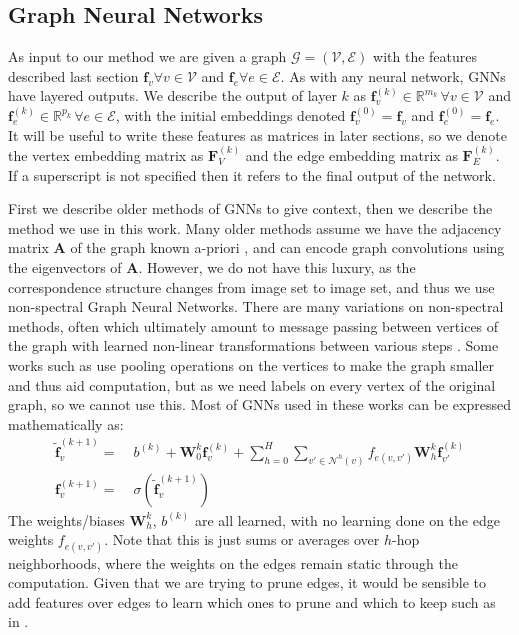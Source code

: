 \documentclass[10pt,twocolumn,letterpaper]{article}
\newcommand{\bR}{\mathbb{R}}
\newcommand{\mat}[1]{\mathbf{#1}}
\begin{document}
\subsection{Graph Neural Networks}
As input to our method we are given a graph $\mathcal{G} = (\mathcal{V}, \mathcal{E})$ with the features described last section $\mat{f}_v \forall v \in \mathcal{V}$ and $\mat{f}_e \forall e \in \mathcal{E}$.
As with any neural network, GNNs have layered outputs.
We describe the output of layer $k$ as $\mat{f}_v^{(k)} \in \bR^{m_k}\, \forall v \in \mathcal{V}$ and $\mat{f}_e^{(k)} \in \bR^{p_k}\, \forall e \in \mathcal{E}$, with the initial embeddings denoted $\mat{f}_v^{(0)} = \mat{f}_v$ and $\mat{f}_e^{(0)} = \mat{f}_e$.
It will be useful to write these features as matrices in later sections, so we denote the vertex embedding matrix as $\mat{F}_V^{(k)}$ and the edge embedding matrix as $\mat{F}_E^{(k)}$.
If a superscript is not specified then it refers to the final output of the network.

First we describe older methods of GNNs to give context, then we describe the method we use in this work.
Many older methods assume we have the adjacency matrix $\mat{A}$ of the graph known a-priori \cite{bruna2013spectral}, and can encode graph convolutions using the eigenvectors of $\mat{A}$.
However, we do not have this luxury, as the correspondence structure changes from image set to image set, and thus we use non-spectral Graph Neural Networks.
There are many variations on non-spectral methods, often which ultimately amount to message passing between vertices of the graph with learned non-linear transformations between various steps \cite{kipf2017semi, defferrard2016convolutional, gama2018mimo, gama2018convolutional}.
Some works such as \cite{gama2019convolutional} use pooling operations on the vertices to make the graph smaller and thus aid computation, but as we need labels on every vertex of the original graph, so we cannot use this.
Most of GNNs used in these works can be expressed mathematically as:
\begin{align*}
\mat{\tilde{f}}_v^{(k+1)} =&\; b^{(k)} + \mat{W}_0^{k} \mat{f}_{v}^{(k)} + \sum_{h=0}^H \sum_{v' \in \mathcal{N}^{h}(v)} f_{e(v,v')} \mat{W}_{h}^{k} \mat{f}_{v'}^{(k)} \\
\mat{f}_v^{(k+1)} =&\; \sigma\left(\mat{\tilde{f}}_v^{(k+1)}\right)
\end{align*}
The weights/biases $\mat{W}_{h}^{k}$, $b^{(k)}$ are all learned, with no learning done on the edge weights $f_{e(v,v')}$. 
Note that this is just sums or averages over $h$-hop neighborhoods, where the weights on the edges remain static through the computation.
Given that we are trying to prune edges, it would be sensible to add features over edges to learn which ones to prune and which to keep such as in \cite{scarselli2009graph}.
\end{document}

